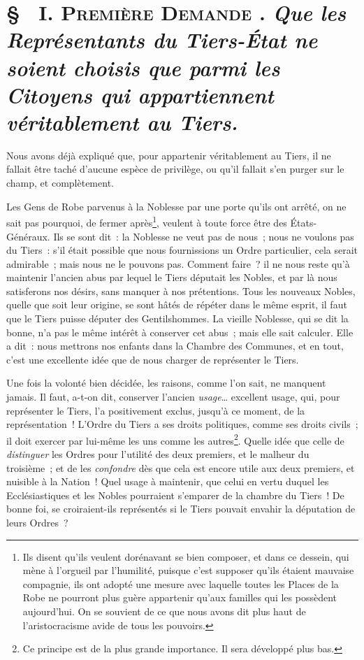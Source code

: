 \documentclass[french,twoside]{book} %
\begin{document}
\section[{§  I. Première Demande . Que les Représentants du Tiers-État ne soient choisis que parmi les Citoyens qui appartiennent véritablement au Tiers.}]{ \textsc{§ } {\scshape I. Première Demande} \textsc{. } {\itshape Que les Représentants du Tiers-État ne soient choisis que parmi les Citoyens qui appartiennent véritablement au Tiers.} }
\noindent Nous avons déjà expliqué que, pour appartenir véritablement au Tiers, il ne fallait être taché d’aucune espèce de privilège, ou qu’il fallait s’en purger sur le champ, et complètement.\par
Les Gens de Robe parvenus à la Noblesse par une porte qu’ils ont arrêté, on ne sait pas pourquoi, de fermer après\footnote{Ils disent qu’ils veulent dorénavant se bien composer, et dans ce dessein, qui mène à l’orgueil par l’humilité, puisque c’est supposer qu’ils étaient mauvaise compagnie, ils ont adopté une mesure avec laquelle toutes les Places de la Robe ne pourront plus guère appartenir qu’aux familles qui les possèdent aujourd’hui. On se souvient de ce que nous avons dit plus haut de l’aristocracisme avide de tous les pouvoirs.}, veulent à toute force être des États-Généraux. Ils se sont dit : la Noblesse ne veut pas de nous ; nous ne voulons pas du Tiers : s’il était possible que nous fournissions un Ordre particulier, cela serait admirable ; mais nous ne le pouvons pas. Comment faire ? il ne nous reste qu’à maintenir l’ancien abus par lequel le Tiers députait les Nobles, et par là nous satisferons nos désirs, sans manquer à nos prétentions. Tous les nouveaux Nobles, quelle que soit leur origine, se sont hâtés de répéter dans le même esprit, il faut que le Tiers puisse députer des Gentilshommes. La vieille Noblesse, qui se dit la bonne, n’a pas le même intérêt à conserver cet abus ; mais elle sait calculer. Elle a dit : nous mettrons nos enfants dans la Chambre des Communes, et en tout, c’est une excellente idée que de nous charger de représenter le Tiers.\par
Une fois la volonté bien décidée, les raisons, comme l’on sait, ne manquent jamais. Il faut, a-t-on dit, conserver l’ancien {\itshape usage}… excellent usage, qui, pour représenter le Tiers, l’a positivement exclus, jusqu’à ce moment, de la représentation ! L’Ordre du Tiers a ses droits politiques, comme ses droits civils ; il doit exercer par lui-même les uns comme les autres\footnote{Ce principe est de la plus grande importance. Il sera développé plus bas.}. Quelle idée que celle de {\itshape distinguer} les Ordres pour l’utilité des deux premiers, et le malheur du troisième ; et de les {\itshape confondre} dès que cela est encore utile aux deux premiers, et nuisible à la Nation ! Quel usage à maintenir, que celui en vertu duquel les Ecclésiastiques et les Nobles pourraient s’emparer de la chambre du Tiers ! De bonne foi, se croiraient-ils représentés si le Tiers pouvait envahir la députation de leurs Ordres ?\par
\end{document}
